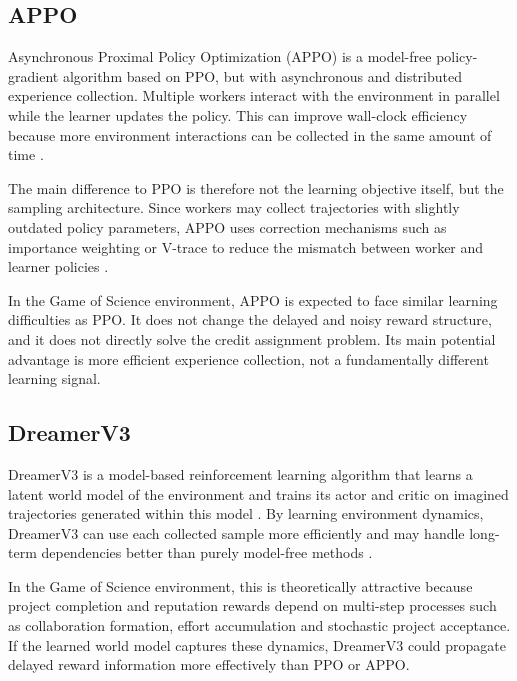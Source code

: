 \documentclass[english,bachelor]{hsluthesis}
\begin{document}
\subsection{APPO}

Asynchronous Proximal Policy Optimization (APPO) is a model-free policy-gradient algorithm based on PPO, but with asynchronous and distributed experience collection. Multiple workers interact with the environment in parallel while the learner updates the policy. This can improve wall-clock efficiency because more environment interactions can be collected in the same amount of time \cite{DBLP:journals/corr/abs-1912-00167}.

The main difference to PPO is therefore not the learning objective itself, but the sampling architecture. Since workers may collect trajectories with slightly outdated policy parameters, APPO uses correction mechanisms such as importance weighting or V-trace to reduce the mismatch between worker and learner policies \cite{DBLP:journals/corr/abs-1912-00167}.

In the Game of Science environment, APPO is expected to face similar learning difficulties as PPO. It does not change the delayed and noisy reward structure, and it does not directly solve the credit assignment problem. Its main potential advantage is more efficient experience collection, not a fundamentally different learning signal.

\subsection{DreamerV3}

DreamerV3 is a model-based reinforcement learning algorithm that learns a latent world model of the environment and trains its actor and critic on imagined trajectories generated within this model \cite{hafner2024masteringdiversedomainsworld}. By learning environment dynamics, DreamerV3 can use each collected sample more efficiently and may handle long-term dependencies better than purely model-free methods \cite{hafner2024masteringdiversedomainsworld}.

In the Game of Science environment, this is theoretically attractive because project completion and reputation rewards depend on multi-step processes such as collaboration formation, effort accumulation and stochastic project acceptance. If the learned world model captures these dynamics, DreamerV3 could propagate delayed reward information more effectively than PPO or APPO.
\end{document}
